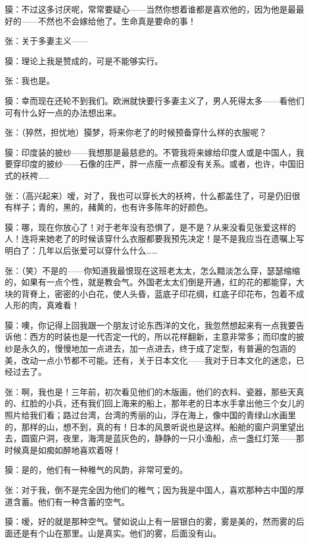 \par 獏：不过这多讨厌呢，常常要疑心——当然你想着谁都是喜欢他的，因为他是最最好的——不然也不会嫁给他了。生命真是要命的事！
\par 张：关于多妻主义——
\par 獏：理论上我是赞成的，可是不能够实行。
\par 张：我也是。
\par 獏：幸而现在还轮不到我们。欧洲就快要行多妻主义了，男人死得太多——看他们可有什么好一点的办法想出来。
\par 张：（猝然，担忧地）獏梦，将来你老了的时候预备穿什么样的衣服呢？
\par 獏：印度装的披纱——我想那是最慈悲的。不管我将来嫁给印度人或是中国人，我要穿印度的披纱——石像的庄严，胖一点瘦一点都没有关系。或者，也许，中国旧式的袄袴……
\par 张：（高兴起来）嗳，对了，我也可以穿长大的袄袴，什么都盖住了，可是仍旧很有样子；青的，黑的，赭黄的，也有许多陈年的好颜色。
\par 獏：哪，现在你放心了！对于老年没有恐惧了，是不是？从来没看见张爱这样的人！连将来她老了的时候该穿什么衣服都要我预先决定！是不是我应当在遗嘱上写明白了：几年以后张爱可以穿什么什么……
\par 张：（笑）不是的——你知道我最恨现在这班老太太，怎么黯淡怎么穿，瑟瑟缩缩的，如果有一点个性，就是教会气。外国老太太们倒是开通，红的花的都能穿，大块的背脊上，密密的小白花，使人头昏，蓝底子印花绸，红底子印花布，包着不成人形的肉，真难看！
\par 獏：噢，你记得上回我跟一个朋友讨论东西洋的文化，我忽然想起来有一点我要告诉他：西方的时装也是一代否定一代的，所以花样翻新，主意非常多；而印度的披纱是永久的，慢慢地加一点进去，加一点进去，终于成了定型，有普遍的包涵的美，改动一点小节都不可能。还有，关于日本文化——我对于日本文化的迷恋，已经过去了。
\par 张：啊，我也是！三年前，初次看见他们的木版画，他们的衣料、瓷器，那些天真的、红脸的小兵，还有我们回上海来的船上，那年老的日本水手拿出他三个女儿的照片给我们看；路过台湾，台湾的秀丽的山，浮在海上，像中国的青绿山水画里的，那样的山，想不到，真的有！日本的风景听说也是这样。船舱的窗户洞里望出去，圆窗户洞，夜里，海湾是蓝灰色的，静静的一只小渔船，点一盏红灯笼——那时候真是如痴如醉地喜欢着呀！
\par 獏：是的，他们有一种稚气的风韵，非常可爱的。
\par 张：对于我，倒不是完全因为他们的稚气；因为我是中国人，喜欢那种古中国的厚道含蓄。他们有一种含蓄的空气。
\par 獏：嗳，好的就是那种空气。譬如说山上有一层银白的雾，雾是美的，然而雾的后面还是有个山在那里。山是真实。他们的雾，后面没有山。
